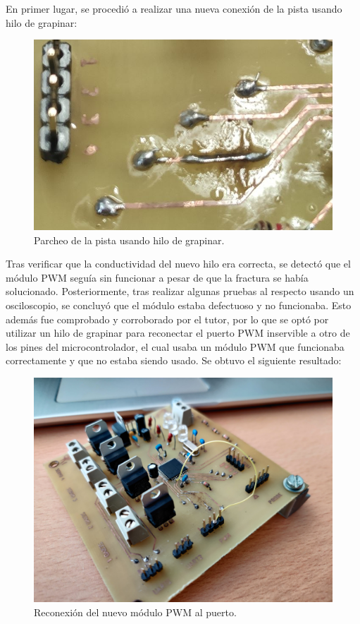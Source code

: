 \begin{itemize}
    En primer lugar, se procedió a realizar una nueva conexión de la pista usando hilo de grapinar:
    
    \begin{figure}[H]
    \centering 
    \includegraphics[width=0.65\linewidth]{pictures/Parche.jpg}
    \caption{Parcheo de la pista usando hilo de grapinar.}
    \end{figure}
    
   Tras verificar que la conductividad del nuevo hilo era correcta, se detectó que el módulo PWM seguía sin funcionar a pesar de que la fractura se había solucionado. Posteriormente, tras realizar algunas pruebas al respecto usando un osciloscopio, se concluyó que el módulo estaba defectuoso y no funcionaba.
   Esto además fue comprobado y corroborado por el tutor, por lo que se optó por utilizar un hilo de grapinar para reconectar el puerto PWM inservible a otro de los pines del microcontrolador, el cual usaba un módulo PWM que funcionaba correctamente y que no estaba siendo usado. Se obtuvo el siguiente resultado:
   
    \begin{figure}[H]
    \centering 
    \includegraphics[width=0.65\linewidth]{pictures/HiloGrapinar.jpg}
    \caption{Reconexión del nuevo módulo PWM al puerto.}
    \label{fig:Reconex}
    \end{figure}
       

\end{itemize}
